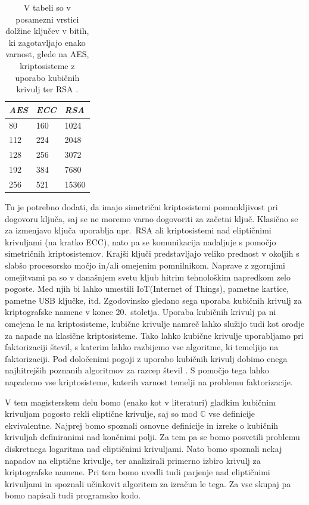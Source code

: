 \documentclass[12pt,a4paper,twoside]{article}
\theoremstyle{definition} %
\theoremstyle{plain} %
\numberwithin{equation}{section}  %
\renewcommand{\C}{\mathbb C}
\begin{document}
\begin{table}[h]
\centering
\begin{tabular}{|l|l|l|}
\hline
\textit{\textbf{AES}} & \textit{\textbf{ECC}} & \textit{\textbf{RSA}} \\ \hline
80                    & 160                   & 1024                  \\ \hline
112                   & 224                   & 2048                  \\ \hline
128                   & 256                   & 3072                  \\ \hline
192                   & 384                   & 7680                  \\ \hline
256                   & 521                   & 15360                 \\ \hline
\end{tabular}
 \caption[Primerjava kriptosistemov.]{V tabeli so v posamezni vrstici dolžine ključev v bitih, ki zagotavljajo enako varnost, glede na AES, kriptosisteme z uporabo kubičnih krivulj ter RSA \cite{NIST}.}
\end{table}
Tu je potrebno dodati, da imajo simetrični kriptosistemi pomankljivost pri dogovoru ključa, saj se ne moremo varno dogovoriti za začetni ključ. Klasično se za izmenjavo ključa uporablja npr.\ RSA ali kriptosistemi nad eliptičnimi krivuljami (na kratko ECC), nato pa se komunikacija nadaljuje s pomočjo simetričnih kriptosistemov. Krajši ključi predstavljajo veliko prednost v okoljih s slabšo procesorsko močjo in/ali omejenim pomnilnikom. Naprave z zgornjimi omejitvami pa so v današnjem svetu kljub hitrim tehnološkim napredkom zelo pogoste. Med njih bi lahko umestili IoT(Internet of Things), pametne kartice, pametne USB ključke, itd. Zgodovinsko gledano sega uporaba kubičnih krivulj za kriptografske namene v konec 20.\ stoletja. Uporaba kubičnih krivulj pa ni omejena le na kriptosisteme, kubične krivulje namreč lahko služijo tudi kot orodje za napade na klasične kriptosisteme. Tako lahko kubične krivulje uporabljamo pri faktorizaciji števil, s katerim lahko razbijemo vse algoritme, ki temeljijo na faktorizaciji.  Pod določenimi pogoji z uporabo kubičnih krivulj dobimo enega najhitrejših poznanih algoritmov za razcep števil \cite{Lenstra1987}. S pomočjo tega lahko napademo vse kriptosisteme, katerih varnost temelji na problemu faktorizacije.

V tem magisterskem delu bomo (enako kot v literaturi) gladkim kubičnim krivuljam pogosto rekli eliptične krivulje, saj so mod $\C$ vse definicije ekvivalentne.
Najprej  bomo spoznali osnovne definicije in izreke o kubičnih krivuljah definiranimi nad končnimi polji. Za tem pa se bomo posvetili problemu diskretnega logaritma nad eliptičnimi krivuljami. Nato bomo spoznali nekaj napadov na eliptične krivulje, ter analizirali primerno izbiro krivulj za kriptografske namene. Pri tem bomo uvedli tudi parjenje nad eliptičnimi krivuljami in spoznali učinkovit algoritem za izračun le tega. Za vse skupaj pa bomo napisali tudi programsko kodo.
\end{document}
